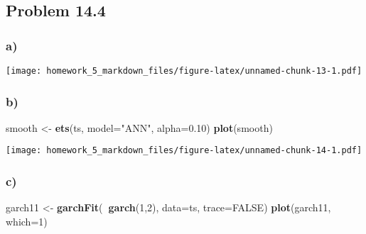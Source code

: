 \documentclass[]{article}
\newenvironment{Shaded}{\begin{snugshade}}{\end{snugshade}}
\newcommand{\KeywordTok}[1]{\textcolor[rgb]{0.13,0.29,0.53}{\textbf{#1}}}
\newcommand{\DataTypeTok}[1]{\textcolor[rgb]{0.13,0.29,0.53}{#1}}
\newcommand{\DecValTok}[1]{\textcolor[rgb]{0.00,0.00,0.81}{#1}}
\newcommand{\FloatTok}[1]{\textcolor[rgb]{0.00,0.00,0.81}{#1}}
\newcommand{\StringTok}[1]{\textcolor[rgb]{0.31,0.60,0.02}{#1}}
\newcommand{\OtherTok}[1]{\textcolor[rgb]{0.56,0.35,0.01}{#1}}
\newcommand{\OperatorTok}[1]{\textcolor[rgb]{0.81,0.36,0.00}{\textbf{#1}}}
\newcommand{\NormalTok}[1]{#1}
\begin{document}
\subsection{Problem 14.4}\label{problem-14.4-1}

\subsubsection{a)}\label{a}

\begin{Shaded}
\end{Shaded}

\texttt{[image: homework\_5\_markdown\_files/figure-latex/unnamed-chunk-13-1.pdf]}

\subsubsection{b)}\label{b}

\begin{Shaded}
\begin{Highlighting}[]
\NormalTok{smooth <-}\StringTok{ }\KeywordTok{ets}\NormalTok{(ts, }\DataTypeTok{model=}\StringTok{"ANN"}\NormalTok{, }\DataTypeTok{alpha=}\FloatTok{0.10}\NormalTok{)}
\KeywordTok{plot}\NormalTok{(smooth)}
\end{Highlighting}
\end{Shaded}

\texttt{[image: homework\_5\_markdown\_files/figure-latex/unnamed-chunk-14-1.pdf]}

\subsubsection{c)}\label{c}

\begin{Shaded}
\begin{Highlighting}[]
\NormalTok{garch11 <-}\StringTok{ }\KeywordTok{garchFit}\NormalTok{(}\OperatorTok{~}\KeywordTok{garch}\NormalTok{(}\DecValTok{1}\NormalTok{,}\DecValTok{2}\NormalTok{), }\DataTypeTok{data=}\NormalTok{ts, }\DataTypeTok{trace=}\OtherTok{FALSE}\NormalTok{)}
\KeywordTok{plot}\NormalTok{(garch11, }\DataTypeTok{which=}\DecValTok{1}\NormalTok{)}
\end{Highlighting}
\end{Shaded}
\end{document}
